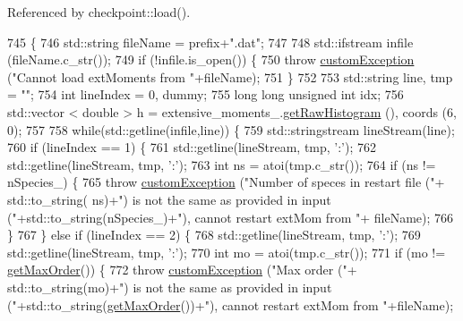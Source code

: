 Referenced by checkpoint\-::load().


\begin{DoxyCode}
745                                                                                          \{
746     std::string fileName = prefix+\textcolor{stringliteral}{".dat"};
747 
748     std::ifstream infile (fileName.c\_str());
749     \textcolor{keywordflow}{if} (!infile.is\_open()) \{
750         \textcolor{keywordflow}{throw} \hyperlink{classcustom_exception}{customException} (\textcolor{stringliteral}{"Cannot load extMoments from "}+fileName);
751     \}
752 
753     std::string line, tmp = \textcolor{stringliteral}{""};
754     \textcolor{keywordtype}{int} lineIndex = 0, dummy;
755     \textcolor{keywordtype}{long} \textcolor{keywordtype}{long} \textcolor{keywordtype}{unsigned} \textcolor{keywordtype}{int} idx;
756     std::vector < double > h = extensive\_moments\_.\hyperlink{classhistogram_a3a75adbce72057f3a4db805d9efc3c9c}{getRawHistogram} (), coords (6, 0);
757 
758     \textcolor{keywordflow}{while}(std::getline(infile,line)) \{
759         std::stringstream lineStream(line);
760         \textcolor{keywordflow}{if} (lineIndex == 1) \{
761             std::getline(lineStream, tmp, \textcolor{charliteral}{':'});
762             std::getline(lineStream, tmp, \textcolor{charliteral}{':'});
763             \textcolor{keywordtype}{int} ns = atoi(tmp.c\_str());
764             \textcolor{keywordflow}{if} (ns != nSpecies\_) \{
765                 \textcolor{keywordflow}{throw} \hyperlink{classcustom_exception}{customException} (\textcolor{stringliteral}{"Number of speces in restart file ("}+ std::to\_string(
      ns)+\textcolor{stringliteral}{") is not the same as provided in input ("}+std::to\_string(nSpecies\_)+\textcolor{stringliteral}{"), cannot restart extMom from "}+
      fileName);
766             \}
767         \} \textcolor{keywordflow}{else} \textcolor{keywordflow}{if} (lineIndex == 2) \{
768             std::getline(lineStream, tmp, \textcolor{charliteral}{':'});
769             std::getline(lineStream, tmp, \textcolor{charliteral}{':'});
770             \textcolor{keywordtype}{int} mo = atoi(tmp.c\_str());
771             \textcolor{keywordflow}{if} (mo != \hyperlink{classsim_system_afe08187d318113c33bda890c69570c36}{getMaxOrder}()) \{
772                 \textcolor{keywordflow}{throw} \hyperlink{classcustom_exception}{customException} (\textcolor{stringliteral}{"Max order ("}+ std::to\_string(mo)+\textcolor{stringliteral}{") is not the same
       as provided in input ("}+std::to\_string(\hyperlink{classsim_system_afe08187d318113c33bda890c69570c36}{getMaxOrder}())+\textcolor{stringliteral}{"), cannot restart extMom from "}+fileName);

\end{DoxyCode}
